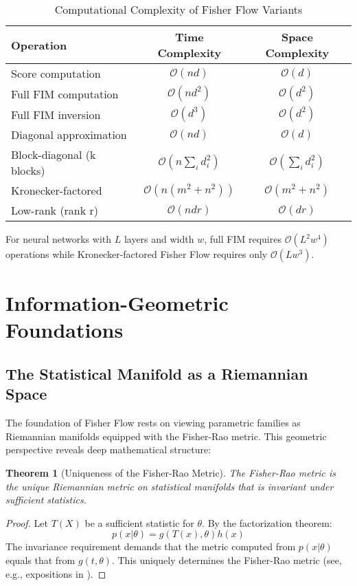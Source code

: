\documentclass[11pt]{article}
\newtheorem{theorem}{Theorem}
\begin{document}
\begin{table}[h]
\centering
\caption{Computational Complexity of Fisher Flow Variants}
\begin{tabular}{lcc}
\toprule
\textbf{Operation} & \textbf{Time Complexity} & \textbf{Space Complexity} \\
\midrule
Score computation & $\mathcal{O}(nd)$ & $\mathcal{O}(d)$ \\
Full FIM computation & $\mathcal{O}(nd^2)$ & $\mathcal{O}(d^2)$ \\
Full FIM inversion & $\mathcal{O}(d^3)$ & $\mathcal{O}(d^2)$ \\
\midrule
Diagonal approximation & $\mathcal{O}(nd)$ & $\mathcal{O}(d)$ \\
Block-diagonal (k blocks) & $\mathcal{O}(n\sum_i d_i^2)$ & $\mathcal{O}(\sum_i d_i^2)$ \\
Kronecker-factored & $\mathcal{O}(n(m^2 + n^2))$ & $\mathcal{O}(m^2 + n^2)$ \\
Low-rank (rank r) & $\mathcal{O}(ndr)$ & $\mathcal{O}(dr)$ \\
\bottomrule
\end{tabular}
\end{table}

For neural networks with $L$ layers and width $w$, full FIM requires $\mathcal{O}(L^2w^4)$ operations while Kronecker-factored Fisher Flow requires only $\mathcal{O}(Lw^3)$.

\section{Information-Geometric Foundations}

\subsection{The Statistical Manifold as a Riemannian Space}

The foundation of Fisher Flow rests on viewing parametric families as Riemannian manifolds equipped with the Fisher-Rao metric. This geometric perspective reveals deep mathematical structure:

\begin{theorem}[Uniqueness of the Fisher-Rao Metric]
\label{thm:fisher_rao_unique}
The Fisher-Rao metric is the unique Riemannian metric on statistical manifolds that is invariant under sufficient statistics.
\end{theorem}

\begin{proof}
Let $T(X)$ be a sufficient statistic for $\theta$. By the factorization theorem:
\begin{equation}
p(x|\theta) = g(T(x), \theta)h(x)
\end{equation}
The invariance requirement demands that the metric computed from $p(x|\theta)$ equals that from $g(t, \theta)$. This uniquely determines the Fisher-Rao metric (see, e.g., expositions in \cite{amari2016information}).
\end{proof}
\end{document}
